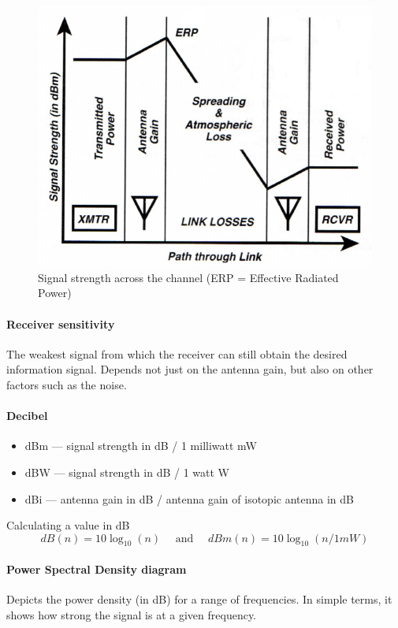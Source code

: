 \begin{figure}[h]
	\centering
	\includegraphics[scale=0.4]{images/1-signal-strength.png}
	\caption{Signal strength across the channel (ERP = Effective Radiated Power)}%
	\label{fig:signal-strength}
\end{figure}

\paragraph{Receiver sensitivity}
The weakest signal from which the receiver can still obtain the desired information signal.
Depends not just on the antenna gain, but also on other factors such as the noise.

\paragraph{Decibel}
\begin{itemize}
	\item dBm --- signal strength in dB / 1 milliwatt mW
	\item dBW --- signal strength in dB / 1 watt W
	\item dBi --- antenna gain in dB / antenna gain of isotopic antenna in dB
\end{itemize}
Calculating a value in dB \[ dB(n) = 10 \log_{10} (n) \quad \text{ and } \quad dBm(n) = 10 \log_{10} (n / 1 mW) \]

\paragraph{Power Spectral Density diagram}
Depicts the power density (in dB) for a range of frequencies.
In simple terms, it shows how strong the signal is at a given frequency.

